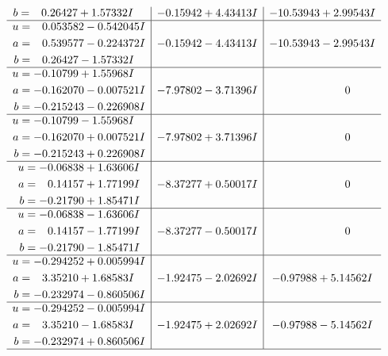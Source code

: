 \documentclass[1p]{elsarticle_modified}
\theoremstyle{definition}
\begin{document}
$$\begin{array}{c|c|c}
\begin{aligned}
b &= \phantom{-}0.26427 + 1.57332 I\end{aligned}
 & -0.15942 + 4.43413 I & -10.53943 + 2.99543 I \\ \hline\begin{aligned}
u &= \phantom{-}0.053582 - 0.542045 I \\
a &= \phantom{-}0.539577 - 0.224372 I \\
b &= \phantom{-}0.26427 - 1.57332 I\end{aligned}
 & -0.15942 - 4.43413 I & -10.53943 - 2.99543 I \\ \hline\begin{aligned}
u &= -0.10799 + 1.55968 I \\
a &= -0.162070 - 0.007521 I \\
b &= -0.215243 - 0.226908 I\end{aligned}
 & -7.97802 - 3.71396 I & \phantom{-0.000000 } 0 \\ \hline\begin{aligned}
u &= -0.10799 - 1.55968 I \\
a &= -0.162070 + 0.007521 I \\
b &= -0.215243 + 0.226908 I\end{aligned}
 & -7.97802 + 3.71396 I & \phantom{-0.000000 } 0 \\ \hline\begin{aligned}
u &= -0.06838 + 1.63606 I \\
a &= \phantom{-}0.14157 + 1.77199 I \\
b &= -0.21790 + 1.85471 I\end{aligned}
 & -8.37277 + 0.50017 I & \phantom{-0.000000 } 0 \\ \hline\begin{aligned}
u &= -0.06838 - 1.63606 I \\
a &= \phantom{-}0.14157 - 1.77199 I \\
b &= -0.21790 - 1.85471 I\end{aligned}
 & -8.37277 - 0.50017 I & \phantom{-0.000000 } 0 \\ \hline\begin{aligned}
u &= -0.294252 + 0.005994 I \\
a &= \phantom{-}3.35210 + 1.68583 I \\
b &= -0.232974 - 0.860506 I\end{aligned}
 & -1.92475 - 2.02692 I & -0.97988 + 5.14562 I \\ \hline\begin{aligned}
u &= -0.294252 - 0.005994 I \\
a &= \phantom{-}3.35210 - 1.68583 I \\
b &= -0.232974 + 0.860506 I\end{aligned}
 & -1.92475 + 2.02692 I & -0.97988 - 5.14562 I\\
 \hline 
 \end{array}$$\newpage
\end{document}
